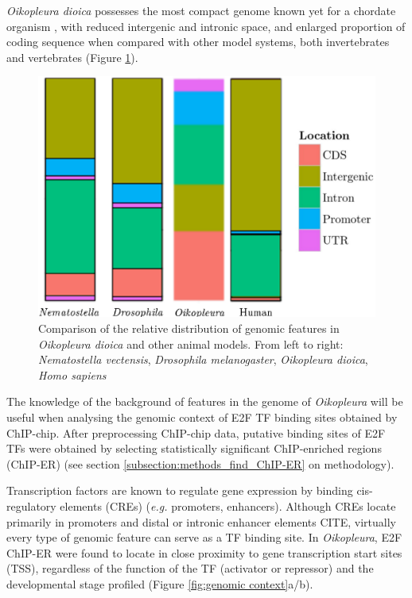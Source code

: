 \documentclass[11pt,twoside,a4paper]{report}
\begin{document}
		\textit{Oikopleura dioica} possesses the most compact genome known yet for a chordate organism \cite{Denoeud2010a}, with reduced intergenic and intronic space, and enlarged proportion of coding sequence when compared with other model systems, both invertebrates and vertebrates (Figure \ref{fig:genome_background}).
	
		\begin{figure}[here]
			\setlength{\belowcaptionskip}{5pt}
			\centering
			\includegraphics[height=0.3\textwidth]{pngs/species_genome2.png}
			\caption[Comparison of the distribution of genomic features in \textit{Oikopleura} and other animal models]
			{Comparison of the relative distribution of genomic features in \textit{Oikopleura dioica} and other animal models.
			{\footnotesize
				From left to right:
					\textit{Nematostella vectensis},
					\textit{Drosophila melanogaster},
					\textit{Oikopleura dioica},
					\textit{Homo sapiens}
				}
			}
			\label{fig:genome_background}
		\end{figure}
		
		The knowledge of the background of features in the genome of \textit{Oikopleura} will be useful when analysing the genomic context of E2F TF binding sites obtained by ChIP-chip. After preprocessing ChIP-chip data, putative binding sites of E2F TFs were obtained by selecting statistically significant ChIP-enriched regions (ChIP-ER) (see section \ref{subsection:methods_find_ChIP-ER} on methodology).
		
		Transcription factors are known to regulate gene expression by binding cis-regulatory elements (CREs) (\textit{e.g.} promoters, enhancers). Although CREs locate primarily in promoters and distal or intronic enhancer elements CITE, virtually every type of genomic feature can serve as a TF binding site. In \textit{Oikopleura}, E2F ChIP-ER were found to locate in close proximity to gene transcription start sites (TSS), regardless of the function of the TF (activator or repressor) and the developmental stage profiled (Figure \ref{fig:genomic context}a/b). 
				
\end{document}

